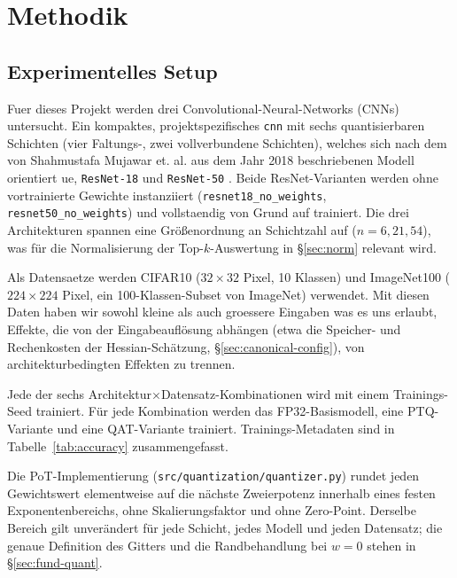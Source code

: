 \section{Methodik}
\label{sec:methodology}

\subsection{Experimentelles Setup}
\label{sec:setup}

Fuer dieses Projekt werden drei Convolutional-Neural-Networks (CNNs) untersucht. Ein kompaktes, projektspezifisches \texttt{cnn} mit sechs quantisierbaren Schichten (vier Faltungs-, zwei vollverbundene Schichten), welches sich nach dem von Shahmustafa Mujawar et. al. aus dem Jahr 2018 beschriebenen Modell orientiert \citep{mujawar2018efficient}ue, \texttt{ResNet-18} \citep{he_resnet_2015} und \texttt{ResNet-50} \citep{he_resnet_2015}. Beide ResNet-Varianten werden ohne vortrainierte Gewichte instanziiert (\texttt{resnet18\_no\_weights}, \texttt{resnet50\_no\_weights}) und vollstaendig von Grund auf trainiert. Die drei Architekturen spannen eine Größenordnung an Schichtzahl auf ($n=6, 21, 54$), was für die Normalisierung der Top-$k$-Auswertung in \S\ref{sec:norm} relevant wird.
\par\medskip

Als Datensaetze werden CIFAR10 \cite{CIFAR10CIFAR100Datasets} ($32\times32$ Pixel, 10 Klassen) und ImageNet100 \cite{tian2020contrastivemultiviewcoding, noauthor_imagenet100_nodate} ($224\times224$ Pixel, ein 100-Klassen-Subset von ImageNet) verwendet. Mit diesen Daten haben wir sowohl kleine als auch groessere Eingaben was es uns erlaubt, Effekte, die von der Eingabeauflösung abhängen (etwa die Speicher- und Rechenkosten der Hessian-Schätzung, \S\ref{sec:canonical-config}), von architekturbedingten Effekten zu trennen.
\par\medskip

Jede der sechs Architektur$\times$Datensatz-Kombinationen wird mit einem Trainings-Seed trainiert. Für jede Kombination werden das FP32-Basismodell, eine PTQ-Variante und eine QAT-Variante trainiert. Trainings-Metadaten sind in Tabelle~\ref{tab:accuracy} zusammengefasst.
\par\medskip

Die PoT-Implementierung (\texttt{src/quantization/quantizer.py}) rundet jeden Gewichtswert elementweise auf die nächste Zweierpotenz innerhalb eines festen Exponentenbereichs, ohne Skalierungsfaktor und ohne Zero-Point. Derselbe Bereich gilt unverändert für jede Schicht, jedes Modell und jeden Datensatz; die genaue Definition des Gitters und die Randbehandlung bei $w=0$ stehen in \S\ref{sec:fund-quant}.

